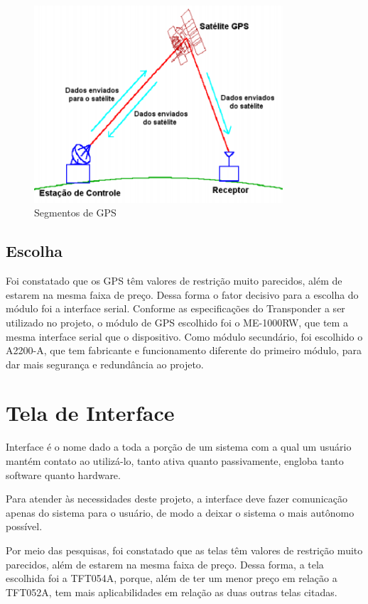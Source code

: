 \begin{figure}[h]
  \centering
  \includegraphics[width=350px, scale=1]{figuras/segmentos_gps}
  \caption{Segmentos de GPS  \cite{9gps}}
\label{fig:segmentos_gps}
\end{figure}

\subsection{Escolha}

Foi constatado que os GPS têm valores de restrição muito parecidos, além de estarem na mesma faixa de preço. Dessa forma o fator decisivo para a escolha do módulo foi a interface serial. Conforme as especificações do Transponder a ser utilizado no projeto, o módulo de GPS escolhido foi o ME-1000RW, que tem a mesma interface serial que o dispositivo. Como módulo secundário, foi escolhido o A2200-A, que tem fabricante e funcionamento diferente do primeiro módulo, para dar mais segurança e redundância ao projeto.

\section {Tela de Interface}

Interface é o nome dado a toda a porção de um sistema com a qual um usuário mantém contato ao utilizá-lo, tanto ativa quanto passivamente, engloba tanto software quanto hardware.

Para atender às necessidades deste projeto, a interface deve fazer comunicação apenas do sistema para o usuário, de modo a deixar o sistema o mais autônomo possível.

Por meio das pesquisas, foi constatado que as telas têm valores de restrição muito parecidos, além de estarem na mesma faixa de preço. Dessa forma, a tela escolhida foi a TFT054A, porque, além de ter um menor preço em relação a TFT052A, tem mais aplicabilidades em relação as duas outras telas citadas.

